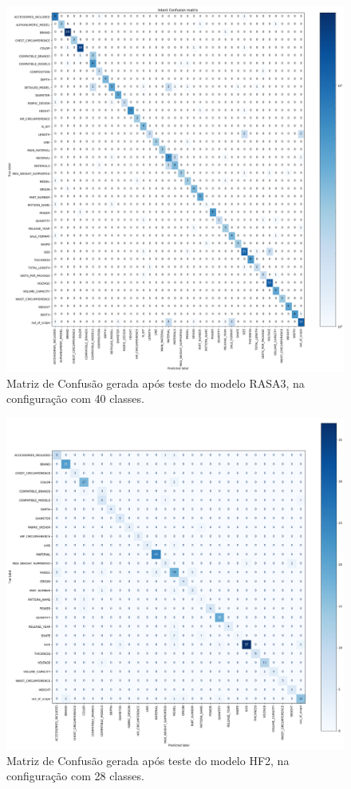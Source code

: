 \begin{figure}[!ht]
    \centering
	\includegraphics[width=1\linewidth]{figuras/RASA3.png}
	\caption{Matriz de Confusão gerada após teste do modelo RASA3, na configuração com 40 classes.}
	\label{fig:matriz_rasa3}
\end{figure}

\begin{figure}[!ht]
    \centering
	\includegraphics[width=1\linewidth]{figuras/HF2-28_classes.png}
	\caption{Matriz de Confusão gerada após teste do modelo HF2, na configuração com 28 classes.}
	\label{fig:matriz_hf2_28_classes}
\end{figure}

